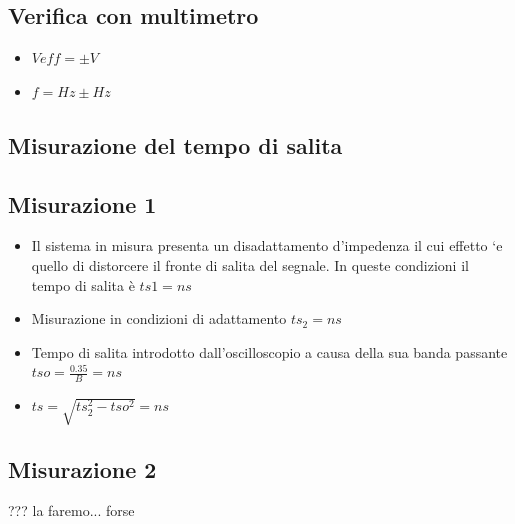 \documentclass[a4paper]{article}
\begin{document}
\subsection{Verifica con multimetro}
\begin{itemize}
\item \(Veff= \pm V \)
\item \(f= Hz \pm Hz \)
\end{itemize}


\begin{tcolorbox}[breakable,colback=cyan,colframe=cyan]
\section*{Misurazione del tempo di salita}
\end{tcolorbox}


\subsection{ Misurazione 1}
\begin{itemize}
\item Il sistema in misura presenta un disadattamento d’impedenza il cui effetto `e quello di distorcere il fronte di salita del segnale. In queste condizioni il tempo di salita è \(ts1 = ns\)
\item Misurazione in condizioni di adattamento \(ts_2 = ns\) 
\item Tempo di salita introdotto dall’oscilloscopio a causa della sua banda passante \(tso=\tfrac{0.35}{B} = ns\)
\item \(ts= \sqrt{ts_2^2 -tso^2} = ns\)
\end{itemize}

\subsection{Misurazione 2}
\colorbox{ProcessBlue}{??? la faremo... forse}
\end{document}
